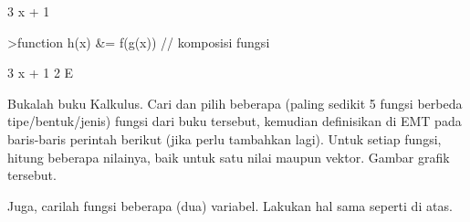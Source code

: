 \documentclass[a4paper,10pt]{article}
\begin{document}
\begin{eulernotebook}
\begin{eulercomment}
\begin{eulercomment}
\begin{euleroutput}
                                 3 x + 1
  
\end{euleroutput}
\begin{eulerprompt}
>function h(x) &= f(g(x)) // komposisi fungsi
\end{eulerprompt}
\begin{euleroutput}
  
                                   3 x + 1
                                2 E
  
\end{euleroutput}
\begin{eulercomment}
Bukalah buku Kalkulus. Cari dan pilih beberapa (paling sedikit 5
fungsi berbeda tipe/bentuk/jenis) fungsi dari buku tersebut, kemudian
definisikan di EMT pada baris-baris perintah berikut (jika perlu
tambahkan lagi). Untuk setiap fungsi, hitung beberapa nilainya, baik
untuk satu nilai maupun vektor. Gambar grafik tersebut.

Juga, carilah fungsi beberapa (dua) variabel. Lakukan hal sama seperti
di atas.


\end{eulercomment}
\end{eulercomment}
\end{eulercomment}
\end{eulernotebook}
\end{document}
